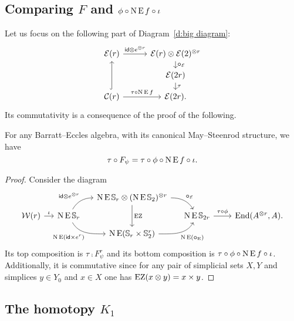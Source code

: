 \subsection{Comparing $F$ and $\phi \mathbin{\circ} \operatorname{N}\operatorname{E} f \mathbin{\circ} \iota$}

Let us focus on the following part of Diagram~\eqref{d:big diagram}:
\[
\begin{tikzcd}[row sep=small]
	\BE(r) \arrow[r,"\id \ot e^{\ot r}"] &[5pt]
	\BE(r) \ot \BE(2)^{\ot r} \arrow[d,"\bcirc_{\BE}"] \\ &
	\BE(2r) \arrow[d, "\tau"] \\
	\cC(r) \arrow[uu,hook] \arrow[r,"\tau \comp \chains\EE f"] & \BE(2r).
\end{tikzcd}
\]
Its commutativity is a consequence of the proof of the following.

\begin{lemma}
	For any Barratt--Eccles algebra, with its canonical May--Steenrod structure, we have
	\[
	\tau \mathbin{\circ} F_\psi = \tau \mathbin{\circ} \phi \mathbin{\circ} \operatorname{N}\operatorname{E} f \mathbin{\circ} \iota.
	\]
\end{lemma}

\begin{proof}
	Consider the diagram
	\begin{equation*}\label{d:F and f}
		\begin{tikzcd}[column sep=small,row sep=tiny]
			&& \chains\EE\sym_r \ot (\chains\EE\sym_2)^{\ot r}
			\arrow[dr,"\bcirc_{\BE}",out=0,in=120]
			\arrow[dd,"\EZ"] &&[10pt] \\
			\cW(r) \arrow[r,"\iota"] &
			\chains\EE\sym_r
			\arrow[ur,"\id \ot e^{\ot r}", out=60,in=180]
			\arrow[dr,"\chains\EE(\id \times e^r)"',out=-60,in=180]
			& & \chains\EE\sym_{2r} \arrow[r,"\tau\comp\phi"] &
			\End(A^{\ot r}, A). \\
			&& \chains\EE(\sym_r \times \sym_2^r)
			\arrow[ur, "\chains\EE(\bcirc_{\EE})"', out=0,in=-120]
			&
		\end{tikzcd}
	\end{equation*}
	Its top composition is $\tau \comp F_\psi^r$ and its bottom composition is $\tau \mathbin{\circ} \phi \mathbin{\circ} \operatorname{N}\operatorname{E} f \mathbin{\circ} \iota$.
	Additionally, it is commutative since for any pair of simplicial sets $X,Y$ and simplices $y \in Y_0$ and $x \in X$ one has $\operatorname{EZ}(x \otimes y) = x \times y$.
\end{proof}

\subsection{The homotopy $K_1$}\label{ss:K1}

